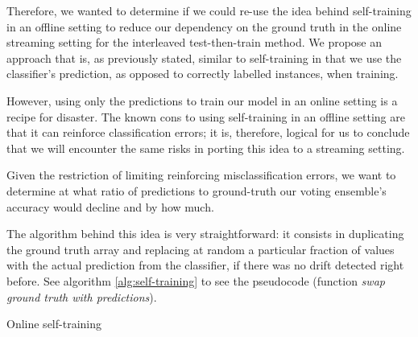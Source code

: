 Therefore, we wanted to determine if we could re-use the idea behind self-training in an offline setting to reduce our dependency on the ground truth in the online streaming setting for the interleaved test-then-train method. We propose an approach that is, as previously stated, similar to self-training in that we use the classifier's prediction, as opposed to correctly labelled instances, when training.

However, using only the predictions to train our model in an online setting is a recipe for disaster. The known cons to using self-training in an offline setting are that it can reinforce classification errors; it is, therefore, logical for us to conclude that we will encounter the same risks in porting this idea to a streaming setting.

Given the restriction of limiting reinforcing misclassification errors, we want to determine at what ratio of predictions to ground-truth our voting ensemble's accuracy would decline and by how much.

The algorithm behind this idea is very straightforward: it consists in duplicating the ground truth array and replacing at random a particular fraction of values with the actual prediction from the classifier, if there was no drift detected right before. See algorithm \ref{alg:self-training} to see the pseudocode (function \textit{swap ground truth with predictions}).

\begin{algorithm}

\caption{\label{alg:self-training}Online self-training}
\end{algorithm}



